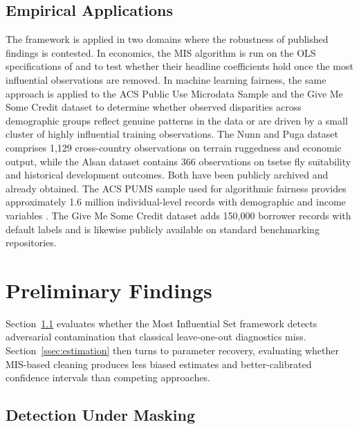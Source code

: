\documentclass[12pt]{article}
\begin{document}
\subsection{Empirical Applications}

The framework is applied in two domains where the robustness of published findings is contested. In economics, the MIS algorithm is run on the OLS specifications of
\parencite{nunn2012ruggedness} and \parencite{alsan2015effect} to test whether their headline coefficients hold once the most influential observations are removed. In machine learning fairness, the same approach is applied to the ACS Public Use Microdata Sample \parencite{ding2021retiring} and the Give Me Some Credit dataset \parencite{jesus2022turning} to determine whether observed disparities across demographic groups reflect genuine patterns in the data or are driven by a small cluster of highly influential training observations. The Nunn and Puga dataset comprises 1,129 cross-country observations on terrain ruggedness and economic output, while the Alsan dataset contains 366 observations on tsetse fly suitability and historical development outcomes. Both have been publicly archived and already obtained. The ACS PUMS sample used for algorithmic fairness provides approximately 1.6 million individual-level records with demographic and income variables \parencite{ding2021retiring}. The Give Me Some Credit dataset adds 150,000 borrower records with default labels \parencite{jesus2022turning} and is likewise publicly available on standard benchmarking repositories.

\section{Preliminary Findings}

Section~\ref{ssec:detection} evaluates whether the Most Influential Set framework detects adversarial contamination that classical leave-one-out diagnostics miss. Section~\ref{ssec:estimation} then turns to parameter recovery, evaluating whether MIS-based cleaning produces less biased estimates and better-calibrated confidence intervals than competing approaches.


\subsection{Detection Under Masking}
\label{ssec:detection}
\end{document}
